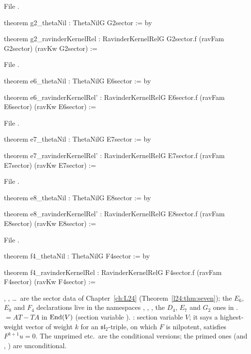 \noindent File .
\begin{leancode}
theorem g2_thetaNil : ThetaNilG G2sector := by

theorem g2_ravinderKernelRel : RavinderKernelRelG G2sector.f (ravFam G2sector) (ravKw G2sector) :=
\end{leancode}
\noindent File .
\begin{leancode}
theorem e6_thetaNil : ThetaNilG E6sector := by

theorem e6_ravinderKernelRel' : RavinderKernelRelG E6sector.f (ravFam E6sector) (ravKw E6sector) :=
\end{leancode}
\noindent File .
\begin{leancode}
theorem e7_thetaNil : ThetaNilG E7sector := by

theorem e7_ravinderKernelRel' : RavinderKernelRelG E7sector.f (ravFam E7sector) (ravKw E7sector) :=
\end{leancode}
\noindent File .
\begin{leancode}
theorem e8_thetaNil : ThetaNilG E8sector := by

theorem e8_ravinderKernelRel' : RavinderKernelRelG E8sector.f (ravFam E8sector) (ravKw E8sector) :=
\end{leancode}
\noindent File .
\begin{leancode}
theorem f4_thetaNil : ThetaNilG F4sector := by

theorem f4_ravinderKernelRel : RavinderKernelRelG F4sector.f (ravFam F4sector) (ravKw F4sector) :=
\end{leancode}

\begin{dictionary}
, , \dots\ are the sector data of Chapter~\ref{ch:L24} (Theorem~\ref{l24:thm:seven}); the
$E_6$, $E_8$ and $F_4$ declarations live in the namespaces , , , the $D_4$, $E_7$ and $G_2$ ones in .
 $=AT-TA$ in $\operatorname{End}(V)$ (section variable ). : section variable $V$; it says a highest-weight
vector of weight $k$ for an $\mathfrak{sl}_2$-triple, on which $F$ is nilpotent, satisfies $F^{k+1}u=0$. The unprimed
 etc.\ are the conditional versions; the primed ones (and
, ) are unconditional.
\end{dictionary}

